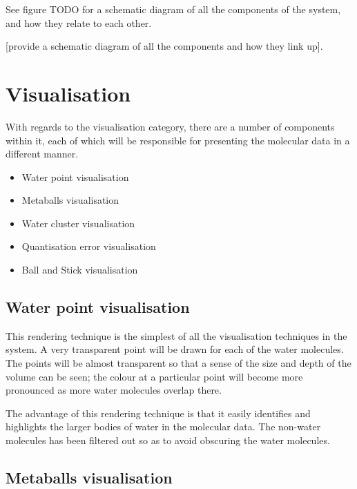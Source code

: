 See figure TODO for a schematic diagram of all the components of the system,
and how they relate to each other.

[provide a schematic diagram of all the components and how they link up].


\section{Visualisation}
\label{sec:design_visualisation}


With regards to the visualisation category, there are a number of components
within it, each of which will be responsible for presenting the molecular data
in a different manner.

\begin{itemize}
  \item Water point visualisation
  \item Metaballs visualisation
  \item Water cluster visualisation
  \item Quantisation error visualisation
  \item Ball and Stick visualisation
\end{itemize}


\subsection{Water point visualisation}
\label{sub:design_waterpoint}

This rendering technique is the simplest of all the visualisation techniques in
the system. A very transparent point will be drawn for each of the water
molecules. The points will be almost transparent so that a sense of the size
and depth of the volume can be seen; the colour at a particular point will
become more pronounced as more water molecules overlap there.

The advantage of this rendering technique is that it easily identifies and
highlights the larger bodies of water in the molecular data. The non-water
molecules has been filtered out so as to avoid obscuring the water molecules.


\subsection{Metaballs visualisation}
\label{sub:design_metaballs}

